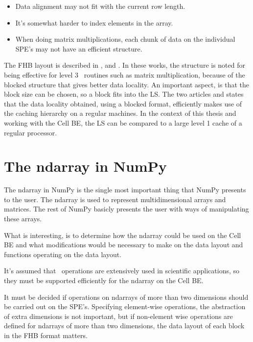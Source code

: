 \begin{itemize}
\item{Data alignment may not fit with the current row length.}
\item{It's somewhat harder to index elements in the array.}
\item{When doing matrix multiplications, each chunk of data on the individual SPE's may not
have an efficient structure.}
\end{itemize}

The FHB layout is described in \cite{scipy}, \cite{hp_storage_hybrid}
and \cite{blockhybridformat}. In these works, the structure is noted
for being effective for level 3 \BLAS\ routines such as matrix
multiplication, because of the blocked structure that gives better
data locality. An important aspect, is that the block size can be
chosen, so a block fits into the LS. The two
articles \cite{hp_storage_hybrid} and \cite{blockhybridformat} states
that the data locality obtained, using a blocked format, efficiently
makes use of the caching hierarchy on a regular machines. In the
context of this thesis and working with the Cell BE, the LS can be
compared to a large level 1 cache of a regular processor.

\section{The ndarray in NumPy}

The ndarray in NumPy is the single most important thing that NumPy
presents to the user. The ndarray is used to represent
multidimensional arrays and matrices. The rest of NumPy basicly
presents the user with ways of manipulating these arrays.

What is interesting, is to determine how the ndarray could be used on
the Cell BE and what modifications would be necessary to make on the
data layout and functions operating on the data layout.

It's assumed that \BLAS\ operations are extensively used in scientific applications, so they must be supported
efficiently for the ndarray on the Cell BE.

It must be decided if operations on ndarrays of more than two
dimensions should be carried out on the SPE's. Specifying element-wise
operations, the abstraction of extra dimensions is not important, but
if non-element wise operations are defined for ndarrays of more than
two dimensions, the data layout of each block in the FHB format
matters.


